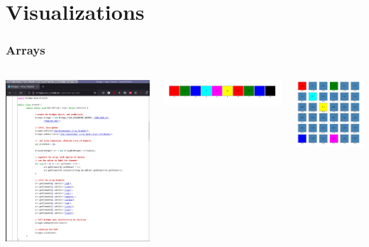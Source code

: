 \documentclass[aspectratio=169]{beamer}
\begin{document}
\section{Visualizations}

\begin{frame}
  \frametitle{Arrays}

  \begin{columns}
    \includegraphics[width=1.0\linewidth]{viz_figs/ArrayCode.png}
    

    \includegraphics[width=1.0\linewidth]{viz_figs/Array1Dout.png}

    \includegraphics[width=.5\linewidth]{viz_figs/Array2Dout.png}


\end{columns}
\end{frame}
\end{document}
